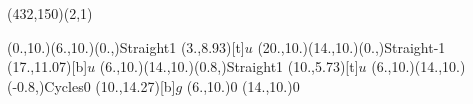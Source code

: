 \unitlength=1bp%

\begin{feynartspicture}(432,150)(2,1)

\FADiagram{}
\FAProp(0.,10.)(6.,10.)(0.,){Straight}{1}
\FALabel(3.,8.93)[t]{$u$}
\FAProp(20.,10.)(14.,10.)(0.,){Straight}{-1}
\FALabel(17.,11.07)[b]{$u$}
\FAProp(6.,10.)(14.,10.)(0.8,){Straight}{1}
\FALabel(10.,5.73)[t]{$u$}
\FAProp(6.,10.)(14.,10.)(-0.8,){Cycles}{0}
\FALabel(10.,14.27)[b]{$g$}
\FAVert(6.,10.){0}
\FAVert(14.,10.){0}

\FADiagram{}
\end{feynartspicture}

